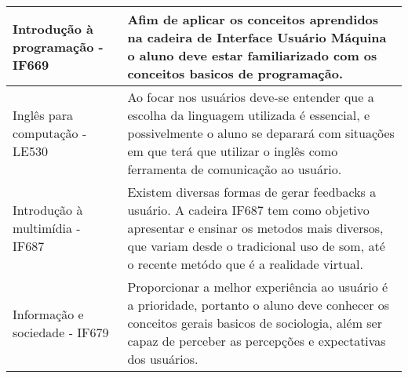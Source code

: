\documentclass[a4paper]{article}
\begin{document}
\begin{table}[h!]
\centering
\begin{tabular}{ | l | p{7.2cm} |}
\hline
Introdução à programação - IF669 & Afim de aplicar os conceitos aprendidos na cadeira de Interface Usuário Máquina o aluno deve estar familiarizado com os conceitos basicos de programação.  \\  \hline

Inglês para computação - LE530 & Ao focar nos usuários deve-se entender que a escolha da linguagem utilizada é essencial, e possivelmente o aluno se deparará com situações em que terá que utilizar o inglês como ferramenta de comunicação ao usuário. \\ \hline

Introdução à multimídia - IF687 & Existem diversas formas de gerar feedbacks a usuário. A cadeira IF687 tem como objetivo apresentar e ensinar os metodos mais diversos, que variam desde o tradicional uso de som, até o recente metódo que é a realidade virtual.\\ \hline

Informação e sociedade - IF679 & Proporcionar a melhor experiência ao usuário é a prioridade, portanto o aluno deve conhecer os conceitos gerais basicos de sociologia, além ser capaz de perceber as percepções e expectativas dos usuários.  \\ \hline

\end{tabular}
\end{table}






\cite{designdeinteracao}
\cite{understandingusers}
\cite{designresearch}
\cite{tccalexandre}
\cite{wiki-userinterface}
\end{document}
